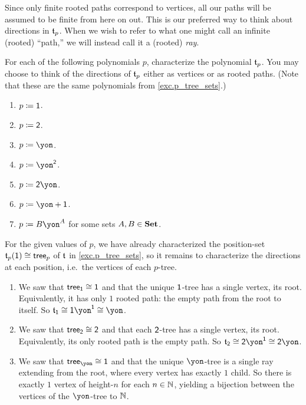 \documentclass[Book-Poly]{subfiles}
\begin{document}
Since only finite rooted paths correspond to vertices, all our paths will be assumed to be finite from here on out. This is our preferred way to think about directions in $\mathfrak{t}_p$.
When we wish to refer to what one might call an infinite (rooted) ``path,'' we will instead call it a (rooted) \emph{ray}.

\begin{exercise}\label{exc.p_tree_polys}
For each of the following polynomials $p$, characterize the polynomial $\mathfrak{t}_p$.
You may choose to think of the directions of $\mathfrak{t}_p$ either as vertices or as rooted paths.
(Note that these are the same polynomials from \cref{exc.p_tree_sets}.)
\begin{enumerate}
	\item \label{exc.p_tree_polys.1} $p\coloneqq\textsf{1}$.
	\item $p\coloneqq\textsf{2}$.
	\item \label{exc.p_tree_polys.unary} $p\coloneqq\yon$.
	\item \label{exc.p_tree_polys.binary} $p\coloneqq\yon^\2$.
	\item \label{exc.p_tree_polys.2_label_ray} $p\coloneqq{\2\yon}$.
	\item \label{exc.p_tree_polys.maybe_unary} $p\coloneqq{\yon+\1}$.
	\item \label{exc.p_tree_polys.monomial} $p\coloneqq{B\yon^A}$ for some sets $A,B\in\mathbf{Set}$.
\qedhere
\end{enumerate}
\begin{solution}
For the given values of $p$, we have already characterized the position-set $\mathfrak{t}_p(\textsf{1})\cong\mathsf{tree}_p$ of $\mathfrak{t}$ in \cref{exc.p_tree_sets}, so it remains to characterize the directions at each position, i.e.\ the vertices of each $p$-tree.
\begin{enumerate}
    \item We saw that $\mathsf{tree}_{\textsf{1}}\cong\textsf{1}$ and that the unique $\textsf{1}$-tree has a single vertex, its root.
    Equivalently, it has only $1$ rooted path: the empty path from the root to itself.
    So $\car{t}_\1\iso\1\yon^\1\iso\yon$.
    \item We saw that $\mathsf{tree}_{\textsf{2}}\cong\textsf{2}$ and that each $\textsf{2}$-tree has a single vertex, its root.
    Equivalently, its only rooted path is the empty path.
    So $\car{t}_\2\iso\2\yon^\1\iso\2\yon$.
    \item We saw that $\tr_\yon\iso\1$ and that the unique $\yon$-tree is a single ray extending from the root, where every vertex has exactly $1$ child.
    So there is exactly $1$ vertex of height-$n$ for each $n\in\mathbb{N}$, yielding a bijection between the vertices of the $\yon$-tree to $\mathbb{N}$.

\end{enumerate}
\end{solution}
\end{exercise}
\end{document}
